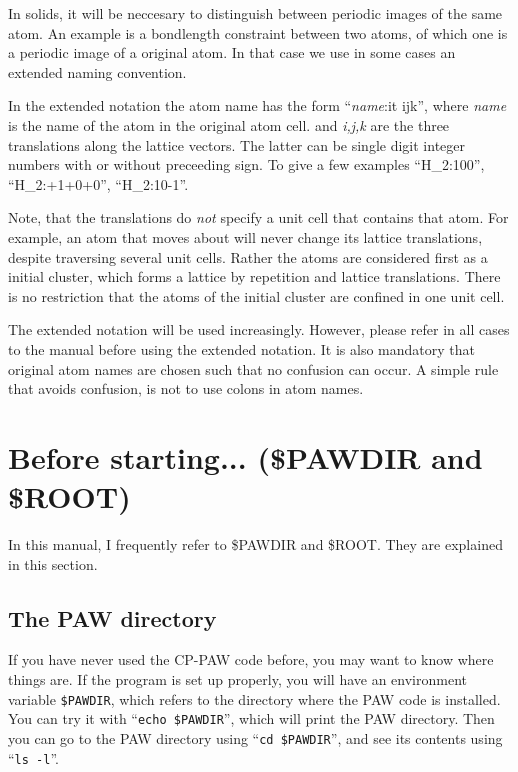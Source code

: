 \documentclass[final,12pt]{article}
\begin{document}
In solids, it will be neccesary to distinguish between periodic images
of the same atom. An example is a bondlength constraint between two
atoms, of which one is a periodic image of a original atom. In that
case we use in some cases an extended naming convention.

In the extended notation the atom name has the form ``{\it name}:{it
  ijk}'', where {\it name} is the name of the atom in the original
atom cell. and {\it i,j,k} are the three translations along the
lattice vectors. The latter can be single digit integer numbers with
or without preceeding sign. To give a few examples ``H\_2:100'',
``H\_2:+1+0+0'', ``H\_2:10-1''.

Note, that the translations do {\em not} specify a unit cell that
contains that atom. For example, an atom that moves about will never
change its lattice translations, despite traversing several unit
cells. Rather the atoms are considered first as a initial cluster, which forms
a lattice by repetition and lattice translations. There is no
restriction that the atoms of the initial cluster are confined in one
unit cell.

The extended notation will be used increasingly. However, please refer
in all cases to the manual before using the extended notation. It is
also mandatory that original atom names are chosen such that no
confusion can occur. A simple rule that avoids confusion, is not to
use colons in atom names.

\section{Before starting... (\$PAWDIR and \$ROOT)}
In this manual, I frequently refer to \$PAWDIR and \$ROOT. They are
explained in this section.

\subsection{The PAW directory}
If you have never used the CP-PAW code before, you may want to know where
things are. If the program is set up properly, you will have an
environment variable {\tt \$PAWDIR}, which refers to the directory
where the PAW code is installed. You can try it with ``{\tt echo
  \$PAWDIR}'', which will print the PAW directory. Then you can go to
the PAW directory using ``{\tt cd \$PAWDIR}'', and see its contents
using ``{\tt ls -l}''.
\end{document}
